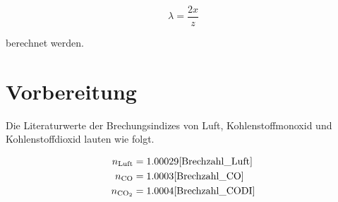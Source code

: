 \begin{equation*}
    \lambda = \frac{2x}{z}
\end{equation*}

\noindent berechnet werden.

\section{Vorbereitung}

Die Literaturwerte der Brechungsindizes von Luft, Kohlenstoffmonoxid und Kohlenstoffdioxid lauten wie folgt.

\begin{align}
    n_\text{Luft} &= 1.00029\text{\cite{Brechzahl_Luft}}\\ 
    n_\text{CO} &= 1.0003\text{\cite{Brechzahl_CO}}\\ 
    n_\text{CO$_2$} &= 1.0004\text{\cite{Brechzahl_CODI}}\\
\end{align}

